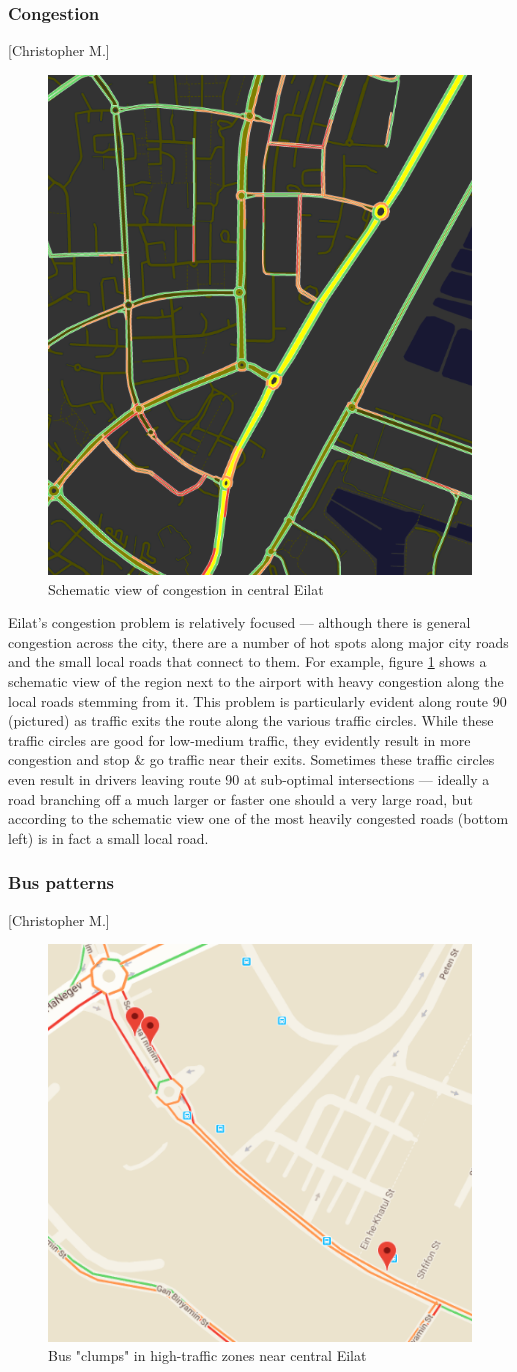 \documentclass[12pt]{article}                       %
\begin{document}
\subsubsection{Congestion}[Christopher M.]
\begin{figure}[H]
    \centering
    \includegraphics[width=0.4\columnwidth]{images/congestion.png}
    \caption{Schematic view of congestion in central Eilat}
    \label{img:eilat_congestion}
\end{figure}

Eilat's congestion problem is relatively focused --- although there is general congestion across the city, there are a number of hot spots along major city roads and the small local roads that connect to them. For example, figure \ref{img:eilat_congestion} shows a schematic view of the region next to the airport with heavy congestion along the local roads stemming from it. This problem is particularly evident along route 90 (pictured) as traffic exits the route along the various traffic circles. While these traffic circles are good for low-medium traffic, they evidently result in more congestion and stop \& go traffic near their exits. Sometimes these traffic circles even result in drivers leaving route 90 at sub-optimal intersections --- ideally a road branching off a much larger or faster one should a very large road, but according to the schematic view one of the most heavily congested roads (bottom left) is in fact a small local road.

\subsubsection{Bus patterns}[Christopher M.]
\begin{figure}[H]
    \centering
    \includegraphics[width=0.6\columnwidth]{images/bus_clump_1.png}
    \caption{Bus "clumps" in high-traffic zones near central Eilat}
    \label{img:bus_clump_1}
\end{figure}
\end{document}
